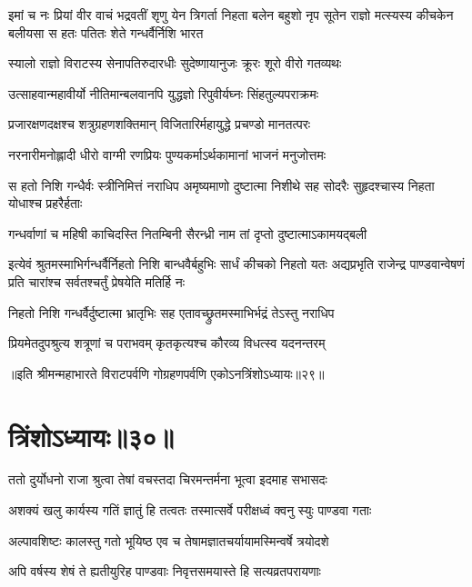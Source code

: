 \onelineshloka
{इमां च नः प्रियां वीर वाचं भद्रवतीं शृणु}
\threelineshloka
{येन त्रिगर्ता निहता बलेन बहुशो नृप}
{सूतेन राज्ञो मत्स्यस्य कीचकेन बलीयसा}
{स हतः पतितः शेते गन्धर्वैर्निशि भारत}


\twolineshloka
{स्यालो राज्ञो विराटस्य सेनापतिरुदारधीः}
{सुदेष्णायानुजः क्रूरः शूरो वीरो गतव्यथः}


\twolineshloka
{उत्साहवान्महावीर्यो नीतिमान्बलवानपि}
{युद्धज्ञो रिपुवीर्यघ्नः सिंहतुल्यपराक्रमः}


\twolineshloka
{प्रजारक्षणदक्षश्च शत्रुग्रहणशक्तिमान्}
{विजितारिर्महायुद्धे प्रचण्डो मानतत्परः}


\twolineshloka
{नरनारीमनोह्लादी धीरो वाग्मी रणप्रियः}
{पुण्यकर्माऽर्थकामानां भाजनं मनुजोत्तमः}


\threelineshloka
{स हतो निशि गन्धैर्वः स्त्रीनिमित्तं नराधिप}
{अमृष्यमाणो दुष्टात्मा निशीथे सह सोदरैः}
{सुहृदश्चास्य निहता योधाश्च प्रहरैर्हताः}


\twolineshloka
{गन्धर्वाणां च महिषी काचिदस्ति नितम्बिनी}
{सैरन्ध्री नाम तां दृप्तो दुष्टात्माऽकामयद्बली}


\onelineshloka
{इत्येवं श्रुतमस्माभिर्गन्धर्वैर्निहतो निशि}
\threelineshloka
{बान्धवैर्बहुभिः सार्धं कीचको निहतो यतः}
{अद्यप्रभृति राजेन्द्र पाण्डवान्वेषणं प्रति}
{चारांश्च सर्वतश्चर्तुं प्रेषयेति मतिर्हि नः}


\twolineshloka
{निहतो निशि गन्धर्वैर्दुष्टात्मा भ्रातृभिः सह}
{एतावच्छ्रुतमस्माभिर्भद्रं तेऽस्तु नराधिप}


\twolineshloka
{प्रियमेतदुपश्रुत्य शत्रूणां च पराभवम्}
{कृतकृत्यश्च कौरव्य विधत्स्व यदनन्तरम्}

॥इति श्रीमन्महाभारते विराटपर्वणि गोग्रहणपर्वणि एकोऽनत्रिंशोऽध्यायः॥२९॥

\chapter{त्रिंशोऽध्यायः॥३०॥}

\twolineshloka
{ततो दुर्योधनो राजा श्रुत्वा तेषां वचस्तदा}
{चिरमन्तर्मना भूत्वा इदमाह सभासदः}


\twolineshloka
{अशक्यं खलु कार्यस्य गतिं ज्ञातुं हि तत्वतः}
{तस्मात्सर्वे परीक्षध्वं क्वनु स्युः पाण्डवा गताः}


\twolineshloka
{अल्पावशिष्टः कालस्तु गतो भूयिष्ठ एव च}
{तेषामज्ञातचर्यायामस्मिन्वर्षे त्रयोदशे}


\twolineshloka
{अपि वर्षस्य शेषं ते ह्यतीयुरिह पाण्डवाः}
{निवृत्तसमयास्ते हि सत्यव्रतपरायणाः}



